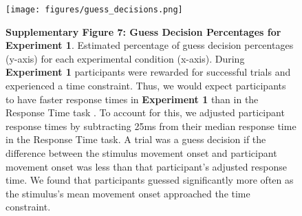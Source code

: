 \documentclass[12pt]{article}
\newcommand\boldblue[1]{\textcolor{mydarkblue}{\textbf{#1}}}
\begin{document}
\begin{figure}[H]
    \centering
    \texttt{[image: figures/guess\_decisions.png]}

    \caption*{\boldblue{Supplementary Figure 7: Guess Decision Percentages for Experiment 1}. 
    Estimated percentage of guess decision percentages (y-axis) for each experimental condition (x-axis). During \boldblue{Experiment 1} participants were rewarded for successful trials and experienced a time constraint. Thus, we would expect participants to have faster response times in \boldblue{Experiment 1} than in the Response Time task \autocite*{milsteinInfluenceExpectedValue2007,shadmehrMovementVigorReflection2019a}. To account for this, we adjusted participant response times by subtracting 25ms from their median response time in the Response Time task. A trial was a guess decision if the difference between the stimulus movement onset and participant movement onset was less than that participant’s adjusted response time. We found that participants guessed significantly more often as the stimulus’s mean movement onset approached the time constraint.}
\end{figure}


\end{document}
